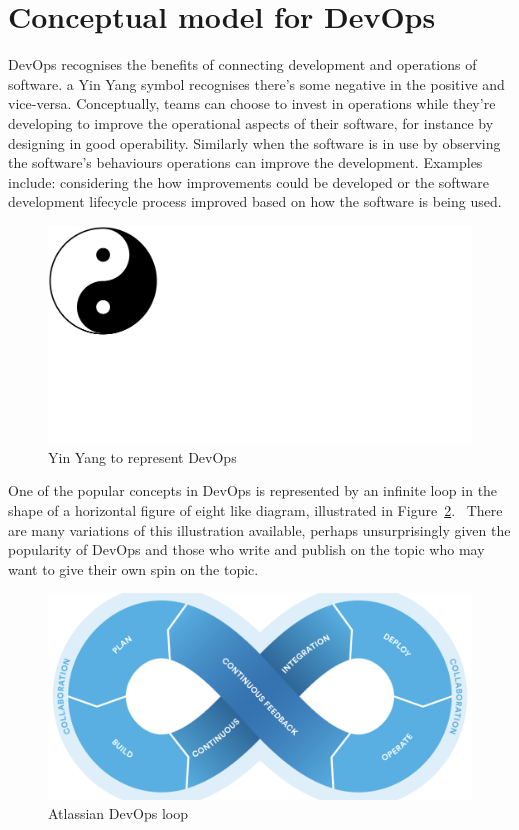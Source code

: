 \section{Conceptual model for DevOps}
DevOps recognises the benefits of connecting development and operations of software. a Yin Yang symbol recognises there's some negative in the positive and vice-versa. Conceptually, teams can choose to invest in operations while they're developing to improve the operational aspects of their software, for instance by designing in good operability. Similarly when the software is in use by observing the software's behaviours operations can improve the development. Examples include: considering the how improvements could be developed or the software development lifecycle process improved based on how the software is being used.

\begin{figure}
    \includegraphics[width=0.5\linewidth]{images/wikipedia/Yin_yang.pdf}
    \caption{Yin Yang to represent DevOps}
    \label{fig:yinyang_for_devops}
\end{figure}



One of the popular concepts in DevOps is represented by an infinite loop in the shape of a horizontal figure of eight like diagram, illustrated in Figure~\ref{fig:atlassian-state-of-devops-report-2016-devopsloop}.~ There are many variations of this illustration available, perhaps unsurprisingly given the popularity of DevOps and those who write and publish on the topic who may want to give their own spin on the topic.

\begin{figure}
    \includegraphics[width=\linewidth]{images/atlassian/atlassian-state-of-devops-report-2016-devopsloop.pdf}
    \caption{Atlassian DevOps loop}
    \label{fig:atlassian-state-of-devops-report-2016-devopsloop}
\end{figure}



